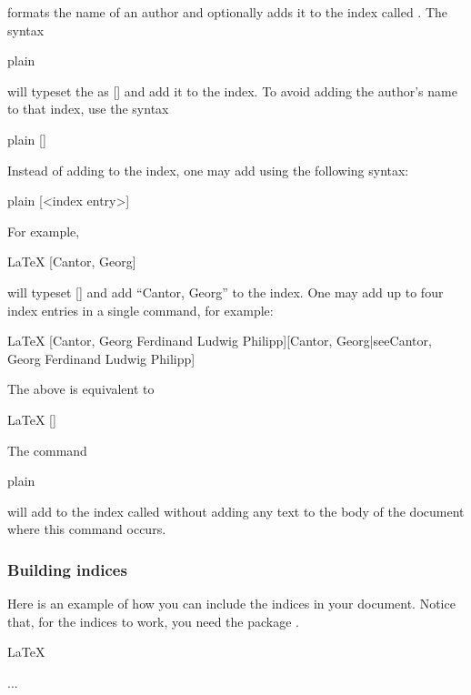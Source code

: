 \code{\anauthor} formats the name of an author and optionally adds it to the index called . The syntax
\begin{snippet}{plain}
\end{snippet}
will typeset the  as [] and add it to the  index. To avoid adding the author's name to that index, use the syntax
\begin{snippet}{plain}
[]
\end{snippet}
Instead of adding  to the  index, one may add  using the following syntax:
\begin{snippet}{plain}
[<index entry>]
\end{snippet}
For example,
\begin{snippet}{LaTeX}
[Cantor, Georg]
\end{snippet}
will typeset [] and add ``Cantor, Georg'' to the  index. One may add up to four index entries in a single \code{\anauthor} command, for example:
\begin{snippet}{LaTeX}
[Cantor, Georg Ferdinand Ludwig Philipp][Cantor, Georg|see{Cantor, Georg Ferdinand Ludwig Philipp}]
\end{snippet}
The above is equivalent to
\begin{snippet}{LaTeX}
[]
\end{snippet}
The command
\begin{snippet}{plain}
\end{snippet}
will add  to the index called  without adding any text to the body of the document where this command occurs.

\subsubsection{Building indices}

Here is an example of how you can include the indices in your document. Notice that, for the indices to work, you need the package .
\begin{snippet}{LaTeX}
\usepackage{multind}




...






\end{snippet}

